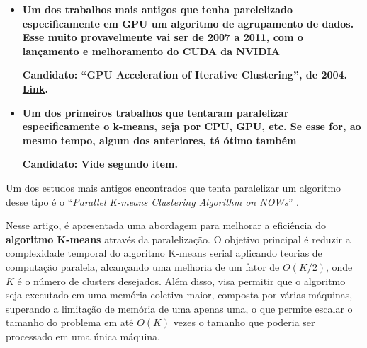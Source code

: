 \documentclass[12pt,
openright, 
oneside, %
a4paper,    %
brazil]{facom-ufu-abntex2}
\begin{document}
\begin{itemize}



  \item \textbf{Um dos trabalhos mais antigos que tenha parelelizado especificamente em GPU um algoritmo de agrupamento de dados. Esse muito provavelmente vai ser de 2007 a 2011, com o lançamento e melhoramento do CUDA da NVIDIA}

  \textbf{Candidato: \enquote{GPU Acceleration of Iterative Clustering}, de 2004. \href{https://www.researchgate.net/profile/John-Hart-17/publication/250176198_GPU_Acceleration_of_Iterative_Clustering/links/5447f8160cf2d62c30529d02/GPU-Acceleration-of-Iterative-Clustering.pdf}{Link}.}

  \item \textbf{Um dos primeiros trabalhos que tentaram paralelizar especificamente o k-means, seja por CPU, GPU, etc. Se esse for, ao mesmo tempo, algum dos anteriores, tá ótimo também}

  \textbf{Candidato: Vide segundo item.}
\end{itemize}

Um dos estudos mais antigos encontrados que tenta paralelizar um algoritmo desse tipo é o \enquote{\textit{Parallel K-means Clustering Algorithm on NOWs}} \cite{kMeansParallelkantabutra2000}.

Nesse artigo, é apresentada uma abordagem para melhorar a eficiência do \textbf{algoritmo K-means} através da paralelização. O objetivo principal é reduzir a complexidade temporal do algoritmo K-means serial aplicando teorias de computação paralela, alcançando uma melhoria de um fator de $O(K/2)$, onde $K$ é o número de clusters desejados. Além disso, visa permitir que o algoritmo seja executado em uma memória coletiva maior, composta por várias máquinas, superando a limitação de memória de uma apenas uma, o que permite escalar o tamanho do problema em até $O(K)$ vezes o tamanho que poderia ser processado em uma única máquina.
\end{document}
